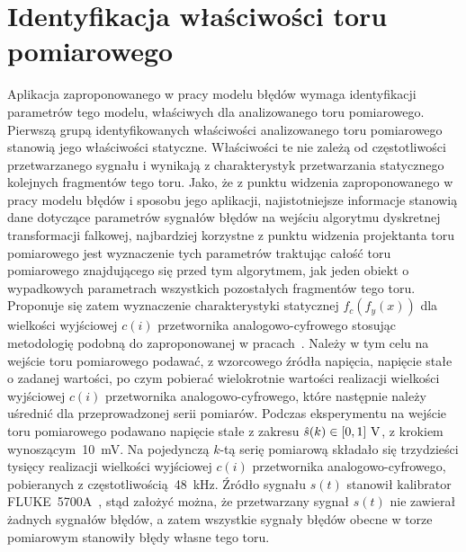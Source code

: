 \section{Identyfikacja właściwości toru pomiarowego}

Aplikacja zaproponowanego w pracy modelu błędów wymaga identyfikacji parametrów tego modelu, właściwych dla analizowanego toru pomiarowego. Pierwszą grupą identyfikowanych właściwości analizowanego toru pomiarowego stanowią jego właściwości statyczne. Właściwości te nie zależą od częstotliwości przetwarzanego sygnału i wynikają z charakterystyk przetwarzania statycznego kolejnych fragmentów tego toru. Jako, że z punktu widzenia zaproponowanego w pracy modelu błędów i sposobu jego aplikacji, najistotniejsze informacje stanowią dane dotyczące parametrów sygnałów błędów na wejściu algorytmu dyskretnej transformacji falkowej, najbardziej korzystne z punktu widzenia projektanta toru pomiarowego jest wyznaczenie tych parametrów traktując całość toru pomiarowego znajdującego się przed tym algorytmem, jak jeden obiekt o wypadkowych parametrach wszystkich pozostałych fragmentów tego toru. Proponuje się zatem wyznaczenie charakterystyki statycznej $f_{c}(f_{y}(x))$ dla wielkości wyjściowej $c(i)$ przetwornika analogowo-cyfrowego stosując metodologię podobną do zaproponowanej w pracach~\cite{kampik_przetworniki, auth_model}. Należy w tym celu na wejście toru pomiarowego podawać, z wzorcowego źródła napięcia, napięcie stałe o zadanej wartości, po czym pobierać wielokrotnie wartości realizacji wielkości wyjściowej $c(i)$ przetwornika analogowo-cyfrowego, które następnie należy uśrednić dla przeprowadzonej serii pomiarów. Podczas eksperymentu na wejście toru pomiarowego podawano napięcie stałe z zakresu $\hat{s}(k) \in \interval{0}{1}~\unit{V}$, z krokiem wynoszącym~\qty{10}{mV}. Na pojedynczą $k$-tą serię pomiarową składało się trzydzieści tysięcy realizacji wielkości wyjściowej $c(i)$ przetwornika analogowo-cyfrowego, pobieranych z częstotliwością~\qty{48}{kHz}. Źródło sygnału $s(t)$ stanowił kalibrator FLUKE~5700A~\cite{fluke_manual}, stąd założyć można, że przetwarzany sygnał $s(t)$ nie zawierał żadnych sygnałów błędów, a zatem wszystkie sygnały błędów obecne w torze pomiarowym stanowiły błędy własne tego toru.

